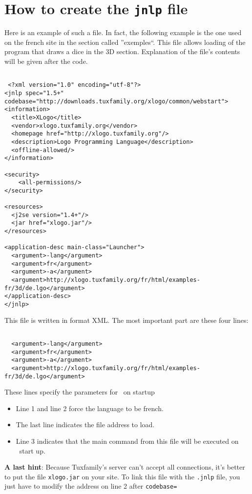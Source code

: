 \section{How to create the \texttt{jnlp} file}
Here is an example of such a file. In fact, the following example is the one used on the french site in the section called ''exemples``. This file allows loading of the program that draws a dice in the 3D section. Explanation of the file's contents will be given after the code.
\begin{verbatim}

 <?xml version="1.0" encoding="utf-8"?>
<jnlp spec="1.5+" codebase="http://downloads.tuxfamily.org/xlogo/common/webstart">
<information>
  <title>XLogo</title>
  <vendor>xlogo.tuxfamily.org</vendor>
  <homepage href="http://xlogo.tuxfamily.org"/>
  <description>Logo Programming Language</description>
  <offline-allowed/>
</information>

<security>
	<all-permissions/>
</security>

<resources>
  <j2se version="1.4+"/>
  <jar href="xlogo.jar"/>
</resources>

<application-desc main-class="Launcher">
  <argument>-lang</argument>
  <argument>fr</argument>
  <argument>-a</argument>
  <argument>http://xlogo.tuxfamily.org/fr/html/examples-fr/3d/de.lgo</argument>
</application-desc>
</jnlp>

\end{verbatim}
This file is written in format XML. The most important part are these four lines:
\begin{verbatim}

  <argument>-lang</argument>
  <argument>fr</argument>
  <argument>-a</argument>
  <argument>http://xlogo.tuxfamily.org/fr/html/examples-fr/3d/de.lgo</argument>

\end{verbatim}
These lines specify the parameters for \xlogo\ on startup 
\begin{itemize}
 \item Line 1 and line 2 force the language to be french.
\item The last line indicates the file address to load.
\item Line 3 indicates that the main command from this file will be executed on \xlogo\ start up.
\end{itemize}
\vspace{0.5cm}
\textbf{A last hint}: Because Tuxfamily's server can't accept all connections, it's better to put the file \texttt{xlogo.jar} on your site. To link this file with the \texttt{.jnlp} file, you just have to modify the address on line 2 after \texttt{codebase=}